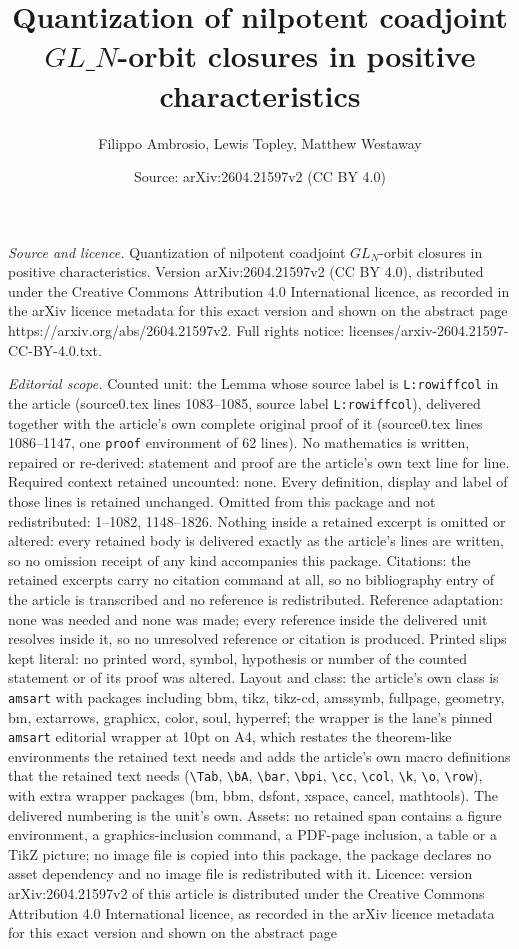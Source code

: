 \documentclass[10pt,a4paper]{amsart}
\title[Quantization of nilpotent coadjoint $GL\_N$-orbit closures in]{Quantization of nilpotent coadjoint $GL\_N$-orbit closures in positive characteristics}
\author{Filippo Ambrosio, Lewis Topley, Matthew Westaway}
\date{Source: arXiv:2604.21597v2 (CC BY 4.0)}
\begin{document}
\maketitle

\noindent\emph{Source and licence.} Quantization of nilpotent coadjoint $GL_N$-orbit closures in positive characteristics. Version arXiv:2604.21597v2 (CC BY 4.0), distributed under the Creative Commons Attribution 4.0 International licence, as recorded in the arXiv licence metadata for this exact version and shown on the abstract page https://arxiv.org/abs/2604.21597v2. Full rights notice: licenses/arxiv-2604.21597-CC-BY-4.0.txt.\par\smallskip

\noindent\textit{Editorial scope.} Counted unit: the Lemma whose source label is \texttt{L:rowiffcol} in the article (source0.tex lines 1083--1085, source label \texttt{L:rowiffcol}), delivered together with the article's own complete original proof of it (source0.tex lines 1086--1147, one \texttt{proof} environment of 62 lines). No mathematics is written, repaired or re-derived: statement and proof are the article's own text line for line. Required context retained uncounted: none. Every definition, display and label of those lines is retained unchanged. Omitted from this package and not redistributed: 1--1082, 1148--1826. Nothing inside a retained excerpt is omitted or altered: every retained body is delivered exactly as the article's lines are written, so no omission receipt of any kind accompanies this package. Citations: the retained excerpts carry no citation command at all, so no bibliography entry of the article is transcribed and no reference is redistributed. Reference adaptation: none was needed and none was made; every reference inside the delivered unit resolves inside it, so no unresolved reference or citation is produced. Printed slips kept literal: no printed word, symbol, hypothesis or number of the counted statement or of its proof was altered. Layout and class: the article's own class is \texttt{amsart} with packages including bbm, tikz, tikz-cd, amssymb, fullpage, geometry, bm, extarrows, graphicx, color, soul, hyperref; the wrapper is the lane's pinned \texttt{amsart} editorial wrapper at 10pt on A4, which restates the theorem-like environments the retained text needs and adds the article's own macro definitions that the retained text needs (\texttt{\textbackslash Tab}, \texttt{\textbackslash bA}, \texttt{\textbackslash bar}, \texttt{\textbackslash bpi}, \texttt{\textbackslash cc}, \texttt{\textbackslash col}, \texttt{\textbackslash k}, \texttt{\textbackslash o}, \texttt{\textbackslash row}), with extra wrapper packages (bm, bbm, dsfont, xspace, cancel, mathtools). The delivered numbering is the unit's own. Assets: no retained span contains a figure environment, a graphics-inclusion command, a PDF-page inclusion, a table or a TikZ picture; no image file is copied into this package, the package declares no asset dependency and no image file is redistributed with it. Licence: version arXiv:2604.21597v2 of this article is distributed under the Creative Commons Attribution 4.0 International licence, as recorded in the arXiv licence metadata for this exact version and shown on the abstract page 
\end{document}
